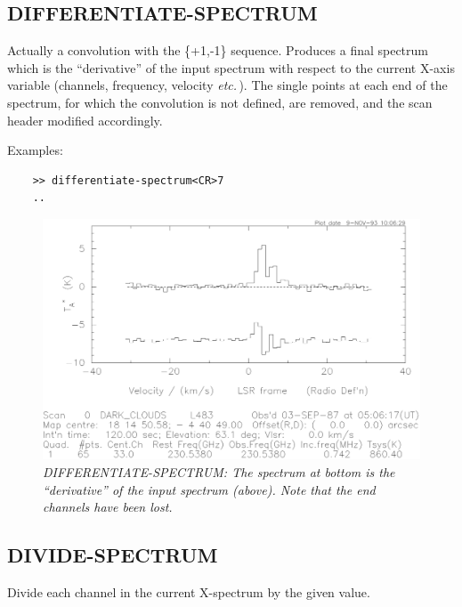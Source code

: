 \documentclass[11pt,twoside]{report}
\newcommand{\etc}{{\it etc.\,}}
\begin{document}
\subsection{DIFFERENTIATE-SPECTRUM} 

Actually a convolution with the \{+1,-1\} sequence. Produces a final spectrum
which is the ``derivative'' of the input spectrum with respect to the
current X-axis variable (channels, frequency, velocity \etc). The single points
at each end of the spectrum, for which the convolution is not defined, are
removed, and the scan header modified accordingly.

Examples:
\begin{verbatim}
    >> differentiate-spectrum<CR>7
    ..
\end{verbatim}

\begin{figure}[htbp]
\begin{center}
\includegraphics[scale=0.65]{diff.ps}
\protect\parbox{5.5in}
{\caption[DIFF]
{\sl
DIFFERENTIATE-SPECTRUM: The spectrum at bottom is the ``derivative'' of the
input spectrum (above). Note that the end channels have been lost.
\label{DIFF}
}
}
\end{center}
\end{figure}

\subsection{DIVIDE-SPECTRUM} 

Divide each channel in the current X-spectrum by the given value.
\end{document}
